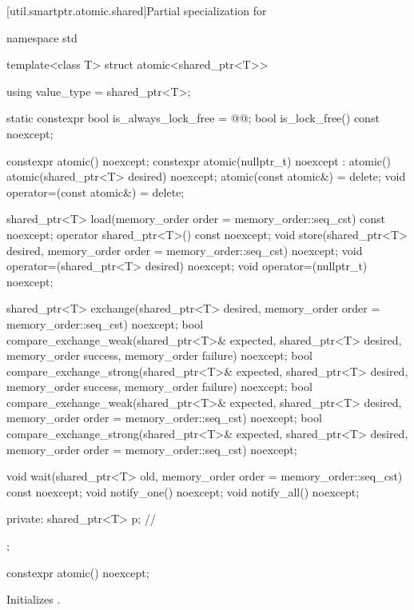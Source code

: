 [util.smartptr.atomic.shared]{Partial specialization for }
%
\begin{codeblock}
namespace std {
  template<class T> struct atomic<shared_ptr<T>> {
    using value_type = shared_ptr<T>;

    static constexpr bool is_always_lock_free = @@;
    bool is_lock_free() const noexcept;

    constexpr atomic() noexcept;
    constexpr atomic(nullptr_t) noexcept : atomic() { }
    atomic(shared_ptr<T> desired) noexcept;
    atomic(const atomic&) = delete;
    void operator=(const atomic&) = delete;

    shared_ptr<T> load(memory_order order = memory_order::seq_cst) const noexcept;
    operator shared_ptr<T>() const noexcept;
    void store(shared_ptr<T> desired, memory_order order = memory_order::seq_cst) noexcept;
    void operator=(shared_ptr<T> desired) noexcept;
    void operator=(nullptr_t) noexcept;

    shared_ptr<T> exchange(shared_ptr<T> desired,
                           memory_order order = memory_order::seq_cst) noexcept;
    bool compare_exchange_weak(shared_ptr<T>& expected, shared_ptr<T> desired,
                               memory_order success, memory_order failure) noexcept;
    bool compare_exchange_strong(shared_ptr<T>& expected, shared_ptr<T> desired,
                                 memory_order success, memory_order failure) noexcept;
    bool compare_exchange_weak(shared_ptr<T>& expected, shared_ptr<T> desired,
                               memory_order order = memory_order::seq_cst) noexcept;
    bool compare_exchange_strong(shared_ptr<T>& expected, shared_ptr<T> desired,
                                 memory_order order = memory_order::seq_cst) noexcept;

    void wait(shared_ptr<T> old, memory_order order = memory_order::seq_cst) const noexcept;
    void notify_one() noexcept;
    void notify_all() noexcept;

  private:
    shared_ptr<T> p;            // \expos
  };
}
\end{codeblock}

%
\begin{itemdecl}
constexpr atomic() noexcept;
\end{itemdecl}

\begin{itemdescr}
\pnum
\effects
Initializes .
\end{itemdescr}

